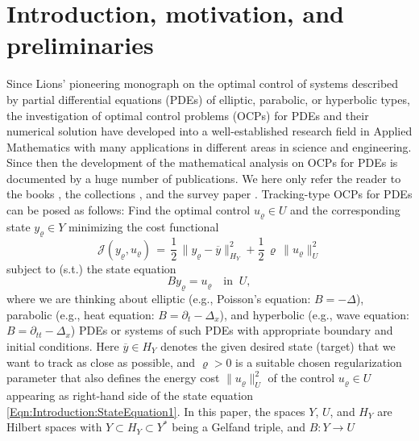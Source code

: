\documentclass{article}
\numberwithin{equation}{section}
\begin{document}
\section{Introduction, motivation, and preliminaries}
\label{Section:Introduction}
Since Lions' pioneering monograph \cite{Lions:1968Book} on the optimal
control of systems described by partial differential equations (PDEs) of
elliptic, parabolic, or hyperbolic types, the investigation of optimal
control problems (OCPs) for PDEs and their numerical solution have
developed into a well-established research field in Applied Mathematics
with many applications in different areas in science and engineering.
Since then the development of the mathematical analysis on OCPs for PDEs
is documented by a huge number of publications. We here only refer the
reader to the books \cite{BorziSchulz2011Book,DeLosReyes:2015Book,
  HinzePinnauUlbrichUlbrich:2009Book,Troeltzsch:2010Book}, 
the collections \cite{HarbirKouriLacassRidzal2018Collection,
  HerzogHeinkenschlossKaliseStadlerTrelat:2022Proceedings,
  LeugeringEngellGriewankEtAl2012Collection}, 
and the survey paper \cite{BorziSchulz:2009SIAMreview}. Tracking-type
OCPs for PDEs can be posed as follows: Find the optimal control
$u_\varrho \in U$ and the corresponding state $y_\varrho \in Y$
minimizing the cost functional 
\begin{equation}\label{Eqn:Introduction:AbstractOCP1}
  {\mathcal{J}}(y_\varrho,u_\varrho) \, = \, \frac{1}{2} \,
  \| y_\varrho - \overline{y} \|_{H_Y}^2 + \frac{1}{2} \, \varrho \,
  \| u_\varrho \|^2_U
\end{equation}
subject to (s.t.) the state equation
\begin{equation}\label{Eqn:Introduction:StateEquation1}
B y_\varrho = u_\varrho \quad \mbox{in} \; \; U,
\end{equation}
where we are thinking about elliptic (e.g., Poisson's equation: $B=-\Delta$), 
parabolic (e.g., heat equation: $B=\partial_t-\Delta_x$), and hyperbolic
(e.g., wave equation: $B=\partial_{tt}-\Delta_x$) PDEs or systems of such PDEs 
with appropriate boundary and initial conditions. Here $\overline{y} \in H_Y$
denotes the given desired state (target) that we want to track as close as
possible, and $\varrho > 0$ is a suitable chosen regularization parameter 
that also defines the energy cost $\| u_\varrho \|^2_U$ of the control
$u_\varrho \in U$ appearing as right-hand side of the state equation
\eqref{Eqn:Introduction:StateEquation1}.
In this paper, the spaces $Y$, $U$, and $H_Y$ are Hilbert spaces 
with $Y \subset H_Y \subset Y^*$ being a Gelfand triple, and $B: Y \to U$ 
\end{document}
